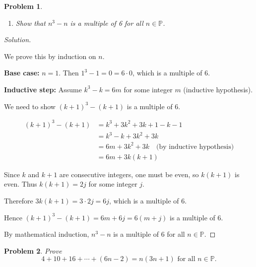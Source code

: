 \documentclass[12pt]{article}
\newtheorem{problem}{Problem}
\newcommand{\PP}{\ensuremath{\mathbb{P}}}
\begin{document}
\setcounter{problem}{3}
\begin{problem}
\begin{enumerate}[label=(\alph*)]
    \item Show that $n^3 - n$ is a multiple of 6 for all $n \in \PP$.
\end{enumerate}
\end{problem}

\begin{proof}[Solution]
~

We prove this by induction on $n$.

\textbf{Base case:} $n = 1$. Then $1^3 - 1 = 0 = 6 \cdot 0$, which is a multiple of 6.

\textbf{Inductive step:} Assume $k^3 - k = 6m$ for some integer $m$ (inductive hypothesis).

We need to show $(k+1)^3 - (k+1)$ is a multiple of 6.

\begin{align*}
(k+1)^3 - (k+1) &= k^3 + 3k^2 + 3k + 1 - k - 1 \\
&= k^3 - k + 3k^2 + 3k \\
&= 6m + 3k^2 + 3k \quad \text{(by inductive hypothesis)} \\
&= 6m + 3k(k + 1)
\end{align*}

Since $k$ and $k+1$ are consecutive integers, one must be even, so $k(k+1)$ is even. Thus $k(k+1) = 2j$ for some integer $j$.

Therefore $3k(k+1) = 3 \cdot 2j = 6j$, which is a multiple of 6.

Hence $(k+1)^3 - (k+1) = 6m + 6j = 6(m + j)$ is a multiple of 6.

By mathematical induction, $n^3 - n$ is a multiple of 6 for all $n \in \PP$.
\end{proof}


\setcounter{problem}{5}
\begin{problem}
Prove
$$4 + 10 + 16 + \cdots + (6n - 2) = n(3n + 1) \text{ for all } n \in \PP.$$
\end{problem}
\end{document}
